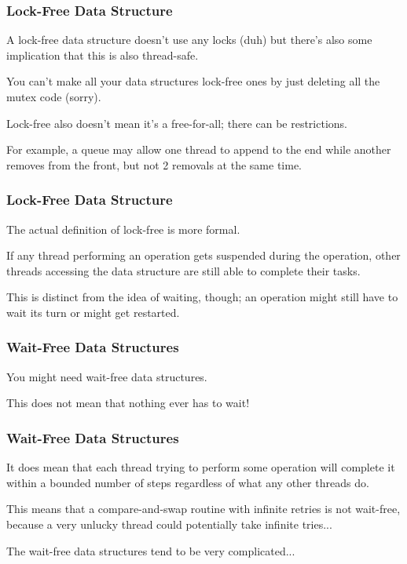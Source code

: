 \begin{frame}
\frametitle{Lock-Free Data Structure}
A lock-free data structure doesn't use any locks (duh) but there's also some implication that this is also thread-safe.

You can't make all your data structures lock-free ones by just deleting all the mutex code (sorry). 

Lock-free also doesn't mean it's a free-for-all; there can be restrictions. 

For example, a queue may allow one thread to append to the end while another removes from the front, but not 2 removals at the same time.
\end{frame}



\begin{frame}
\frametitle{Lock-Free Data Structure}

The actual definition of lock-free is more formal. 

If any thread performing an operation gets suspended during the operation, other threads accessing the data structure are still able to complete their tasks.

This is distinct from the idea of waiting, though; an operation might still have to wait its turn or might get restarted.

\end{frame}



\begin{frame}
\frametitle{Wait-Free Data Structures}

You might need wait-free data structures. 

This does not mean that nothing ever has to wait! 

\end{frame}



\begin{frame}
\frametitle{Wait-Free Data Structures}


It does mean that each thread trying to perform some operation will complete it within a bounded number of steps regardless of what any other threads do. 

This means that a compare-and-swap routine with infinite retries is not wait-free, because a very unlucky thread could potentially take infinite tries...

The wait-free data structures tend to be very complicated...

\end{frame}


